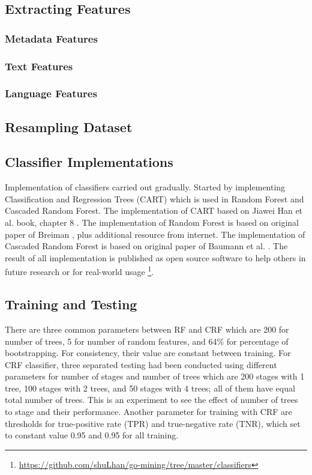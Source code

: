 \subsection{Extracting Features}
	

\subsubsection{Metadata Features}
	

\subsubsection{Text Features}
	

\subsubsection{Language Features}
	

\subsection{Resampling Dataset}
	


\subsection{Classifier Implementations}

Implementation of classifiers carried out gradually.
Started by implementing Classification and Regression Trees (CART)
\cite{breiman1984classification}
which is used in Random Forest and Cascaded Random Forest.
The implementation of CART based on Jiawei Han et al. book, chapter 8
\cite{han2011data}.
The implementation of Random Forest is based on original paper of Breiman
\cite{breiman2001random}, plus additional resource from internet.
The implementation of Cascaded Random Forest is based on original paper of
Baumann et al.
\cite{baumann2013cascaded}.
The result of all implementation is published as open source software to help
others in future research or for real-world usage \footnote{\url{https://github.com/shuLhan/go-mining/tree/master/classifiers}}.


\subsection{Training and Testing}

There are three common parameters between RF and CRF which are 200 for number of
trees, 5 for number of random features, and 64\% for percentage of
bootstrapping.
For consistency, their value are constant between training.
For CRF classifier, three separated testing had been conducted using different
parameters for number of stages and number of trees which are 200 stages with 1
tree, 100 stages with 2 trees, and 50 stages with 4 trees; all of them have
equal total number of trees.
This is an experiment to see the effect of number of trees to stage and their
performance.
Another parameter for training with CRF are thresholds for true-positive rate
(TPR) and true-negative rate (TNR), which set to constant value 0.95 and 0.95
for all training.

